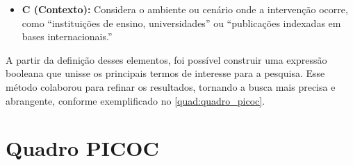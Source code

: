 \begin{itemize}
\begin{itemize}
    \item \textbf{C (Contexto):} Considera o ambiente ou cenário onde a intervenção ocorre, como “instituições de ensino, universidades” ou “publicações indexadas em bases internacionais.”
\end{itemize}
A partir da definição desses elementos, foi possível construir uma expressão booleana que unisse os principais termos de interesse para a pesquisa. Esse método colaborou para refinar os resultados, tornando a busca mais precisa e abrangente, conforme exemplificado no \autoref{quad:quadro_picoc}.
\end{itemize}




\section{Quadro PICOC}
\label{section:quadro_picoc}

